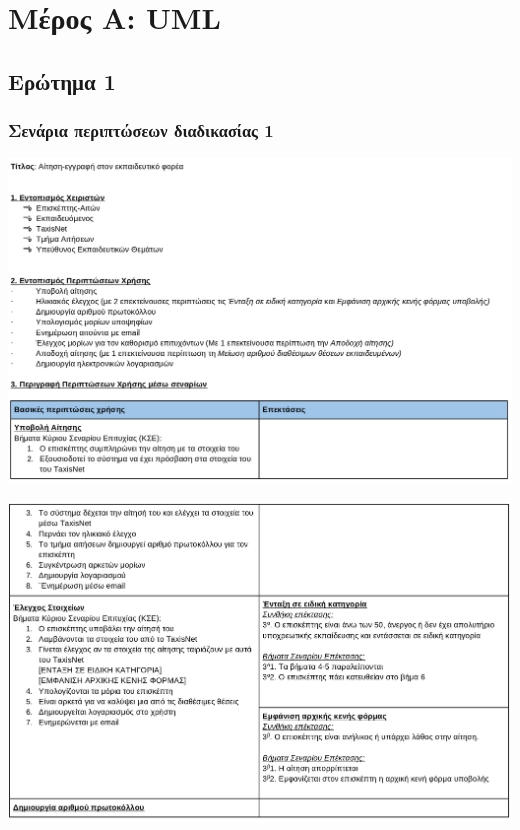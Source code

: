 \documentclass[a4paper, titlepage, twoside]{article}
\begin{document}
\section{Μέρος Α: UML}
\label{sec:org016e52b}

\subsection{Ερώτημα 1}
\label{sec:orgf76e48c}

\subsubsection{Σενάρια περιπτώσεων διαδικασίας 1}
\label{sec:org7083612}

\begin{center}
\includegraphics[width=.9\linewidth]{2023-05-31_23-27-36_screenshot.png}
\end{center}
\begin{center}
\includegraphics[width=.9\linewidth]{2023-05-31_23-27-45_screenshot.png}
\end{center}
\end{document}
